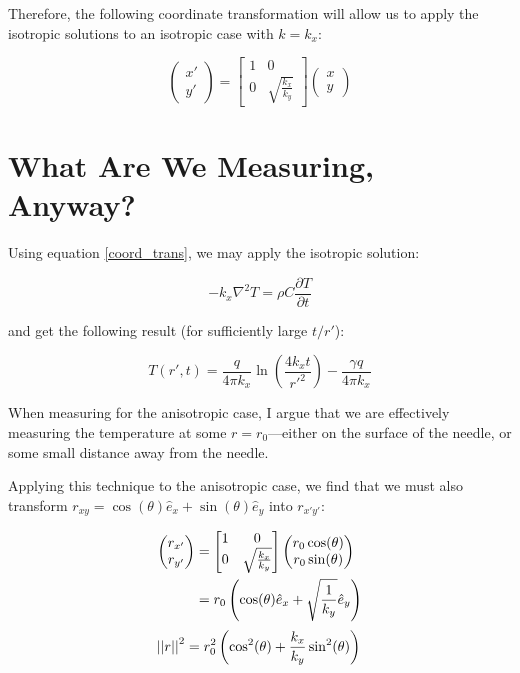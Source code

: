 \documentclass[10pt, letterpaper]{article}
\begin{document}
Therefore, the following coordinate transformation will allow us to apply the
isotropic solutions to an isotropic case with \(k = k_x\):

\begin{equation}
    \label{coord_trans}
    \begin{pmatrix}x' \\ y'\end{pmatrix} =
    \begin{bmatrix}1 & 0\\ 0 & \sqrt{\frac{k_x}{k_y}} \end{bmatrix}\begin{pmatrix}x \\ y\end{pmatrix}
\end{equation}

\section{What Are We Measuring, Anyway?}

Using equation \ref{coord_trans}, we may apply the isotropic solution:

\begin{equation}
    -k_x \nabla^2 T = \rho C\frac{\partial T}{\partial t}
\end{equation}

and get the following result (for sufficiently large \(t/r'\)):

\begin{equation}
T(r',t) = \frac{q}{4\pi k_x}\ln\left(\frac{4k_xt}{r'^2}\right) - \frac{\gamma q}{4\pi k_x}
\end{equation}

When measuring for the anisotropic case, I argue that we are effectively measuring the temperature at some \(r = r_{\textrm{0}}\)---either on the surface of the needle, or some small distance away from the needle.

Applying this technique to the anisotropic case, we find that we must also transform \(r_{xy} = \cos(\theta) \hat{e}_x + \sin(\theta) \hat{e}_y \) into \(r_{x'y'}\):

\begin{align*}
    \begin{pmatrix}r_{x'} \\ r_{y'}\end{pmatrix} &=
    \begin{bmatrix}1 & 0\\ 0 & \sqrt{\frac{k_x}{k_y}} \end{bmatrix}\begin{pmatrix}r_0\cos(\theta) \\ r_0\sin(\theta)\end{pmatrix}\\
    &= r_0\left(\cos(\theta) \hat{e}_x + \sqrt{\frac1{k_y}} \hat{e}_y \right)\\
\end{align*}
\begin{equation}
    \left|\left|{r}\right|\right|^2 = r_0^2 \left(\cos^2(\theta) + \frac{k_x}{k_y}\sin^2(\theta) \right)\\
\end{equation}
\end{document}
